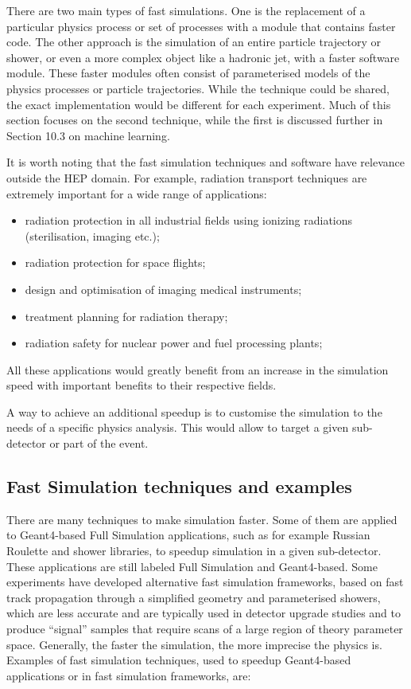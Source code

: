 \documentclass[12pt,a4paper]{article}
\begin{document}
{There are two main types of fast simulations. One is the replacement of
a particular physics process or set of processes with a module that
contains faster code. The other approach is the simulation of an entire
particle trajectory or shower, or even a more complex object like a
hadronic jet, with a faster software module. These faster modules often
consist of parameterised models of the physics processes or particle
trajectories. While the technique could be shared, the exact
implementation would be different for each experiment. Much of this
section focuses on the second technique, while the first is discussed
further in Section 10.3 on machine learning.

It is worth noting that the fast simulation techniques and software have
relevance outside the HEP domain. For example, radiation transport
techniques are extremely important for a wide range of applications:

\begin{itemize}
\item
  radiation protection in all industrial fields using ionizing
  radiations (sterilisation, imaging etc.);
\item
  radiation protection for space flights;
\item
  design and optimisation of imaging medical instruments;
\item
  treatment planning for radiation therapy;
\item
  radiation safety for nuclear power and fuel processing plants;
\end{itemize}

All these applications would greatly benefit from an increase in the
simulation speed with important benefits to their respective fields.

A way to achieve an additional speedup is to customise the simulation to
the needs of a specific physics analysis. This would allow to target a
given sub-detector or part of the event.

\hypertarget{fast-simulation-techniques-and-examples}{%
\subsection{Fast Simulation techniques and
examples}\label{fast-simulation-techniques-and-examples}}

There are many techniques to make simulation faster. Some of them are
applied to Geant4-based Full Simulation applications, such as for
example Russian Roulette and shower libraries, to speedup simulation in
a given sub-detector. These applications are still
labeled Full Simulation and Geant4-based. Some experiments have
developed alternative fast simulation frameworks, based on fast track
propagation through a simplified geometry and parameterised showers,
which are less accurate and are typically used in detector upgrade
studies and to produce ``signal'' samples that require scans of a large
region of theory parameter space. Generally, the faster the simulation,
the more imprecise the physics is. Examples of fast simulation
techniques, used to speedup Geant4-based applications or in fast
simulation frameworks, are:

}
\end{document}
